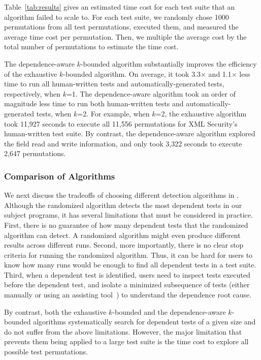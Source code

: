 Table~\ref{tab:results} gives an estimated time cost for each
test suite that an algorithm failed to scale to. For each test suite,
we randomly chose 1000 permutations from all
test permutations, executed them, and measured the average time cost
per permutation. Then, we multiple
the average cost by the total number of permutations to estimate
the time cost.

The dependence-aware $k$-bounded algorithm substantially improves
the efficiency of the exhaustive $k$-bounded algorithm. On average,
it took 3.3$\times$ and 1.1$\times$ less time to run all
human-written tests and automatically-generated tests, respectively, when $k$=1.
The dependence-aware algorithm took an order of magnitude
less time to run both human-written tests and automatically-generated tests,
when $k$=2.
For example, when $k$=2, the exhaustive algorithm took 11,927 seconds
to execute all 11,556 permutations for XML Security's human-written test suite.
By contrast, the dependence-aware algorithm
explored the field read and write information, and
only took 3,322 seconds to execute 2,647 permutations.





\subsubsection{Comparison of Algorithms}
\label{sec:algcomparison}

We next discuss the tradeoffs of choosing different detection
algorithms in \ourtool. Although the randomized algorithm
detects the most dependent tests in our subject programs,
it has several limitations that must be considered
in practice. First, there is no guarantee of how many
dependent tests that the randomized algorithm can detect. A randomized
algorithm might even produce different results across different runs.
Second, more importantly, there is no clear stop criteria
for running the randomized algorithm.
Thus, it can be hard for users
to know how many runs would be enough to find all dependent tests in a test suite.
Third, when a dependent test is identified, users
need to inspect tests executed
before the dependent test, and isolate a minimized
subsequence of tests (either
manually or using an assisting tool~\cite{Zeller:2002}) to understand the dependence root cause.

By contrast, both the exhaustive $k$-bounded and the dependence-aware
$k$-bounded algorithms systematically search for dependent
tests of a given size and do not suffer from the above limitations.
However, the major limitation that prevents them being applied to a
large test suite is the time cost to
explore all possible test permutations.


